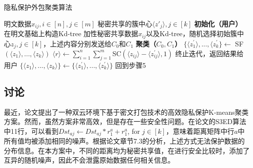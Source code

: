 \begin{algorithm}[htbp]
	\renewcommand{\algorithmicrequire}{\textbf{输入:}}
	\renewcommand{\algorithmicensure}{\textbf{输出:}}
	\caption{隐私保护外包聚类算法}
	\label{alg_ppokc}
	\begin{algorithmic}[1]
		\REQUIRE 明文数据$x_{ij},i\in[n],j\in[m]$
		\ENSURE 秘密共享的簇中心$\langle z'_j \rangle,j\in[k]$
		\STATE \textbf{初始化（用户）}
		\STATE 在明文基础上构造Kd-tree
		\STATE 加性秘密共享数据$x_{ij}$以及Kd-tree，随机选择初始簇中心$z_j,j\in[k]$，上述内容分别发送给$C_0$和$C_1$
		\STATE \textbf{聚类（$C_0,C_1$）}
		\STATE $\{\langle z^{\prime}_1 \rangle,...,\langle z^{\prime}_k\} \leftarrow$ SF$(\langle z_1\rangle,...,\langle z_k\rangle)$
		\STATE $\langle r \rangle \leftarrow \sum_{i=1}^{n}\sum_{j=1}^{m}$SC$(\langle z_{ij}\rangle-\langle z_{ij}^{\prime}\rangle, 1)$
		\STATE 终止迭代，返回结果给用户
		\ELSE
		\STATE $\{\langle z_1 \rangle,...,\langle z_k \rangle \} \leftarrow \{\langle z^{\prime}_1 \rangle,...,\langle z^{\prime}_k\rangle\}$
		\STATE 回到步骤5
		\ENDIF
	\end{algorithmic}
\end{algorithm}

\subsection{讨论}
\label{taolun}
最近，论文\cite{wu2020secure}提出了一种双云环境下基于密文打包技术的高效隐私保护K-means聚类方案。然而，虽然方案非常高效，但是存在一些安全性问题。在论文\cite{wu2020secure}的S3ED算法中11行，可以看到$D s t_{a j} \leftarrow Dst_{a j} * r_1^a+r_1^a$, for $j \in[k]$，意味着距离矩阵中行$ a $中所有值均被添加相同的噪声。根据论文\cite{liu2019toward}章节7.3的分析，上述方式无法保护数据的分布信息。在本方案中，不同的距离均为秘密共享值，在进行安全比较时，添加了互异的随机噪声，因此不会泄露原始数据任何相关信息。



